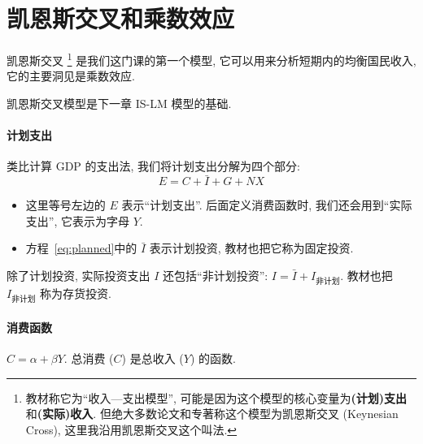 \documentclass[11pt]{ctexart}
\begin{document}
\section*{凯恩斯交叉和乘数效应}

凯恩斯交叉%
    \footnote{教材称它为``收入—支出模型'', 
        可能是因为这个模型的核心变量为\textbf{(计划)支出}和\textbf{(实际)收入}. 
        但绝大多数论文和专著称这个模型为凯恩斯交叉 (Keynesian Cross),
        这里我沿用凯恩斯交叉这个叫法.}
是我们这门课的第一个模型, 它可以用来分析短期内的均衡国民收入,
它的主要洞见是乘数效应.

凯恩斯交叉模型是下一章 IS-LM 模型的基础.

\paragraph{计划支出}
类比计算 GDP 的支出法, 我们将计划支出分解为四个部分: 
\begin{equation}
  E = C + \bar{I} + G + NX 
  \label{eq:planned}  
\end{equation}
\begin{itemize}
\item
  这里等号左边的 $E$ 表示``计划支出''. 后面定义消费函数时, 我们还会用到``实际支出'', 它表示为字母 $Y$. 
\item
  方程~\eqref{eq:planned}中的 $\bar{I}$ 表示计划投资, 教材也把它称为固定投资. 
\end{itemize}

除了计划投资, 实际投资支出 $I$ 还包括``非计划投资'': $I = \bar{I} + I_{\text{非计划}}$.
教材也把 $I_{\text{非计划}}$ 称为存货投资. 

\paragraph{消费函数}
$C = \alpha + \beta  Y$. 总消费 ($C$) 是总收入 ($Y$) 的函数.
\end{document}
